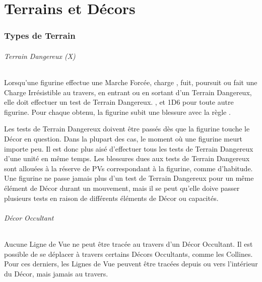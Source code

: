 
\part{Terrains et Décors}

\hypertarget{terraintypes}{\section{Types de Terrain}}
\label{terrain_types}

\paragraph{Terrain Dangereux (X)}

Lorsqu'une figurine effectue une Marche Forcée, charge , fuit, poursuit ou fait une Charge Irrésistible au travers, en entrant ou en sortant d'un Terrain Dangereux, elle doit effectuer un test de Terrain Dangereux. , et 1D6 pour toute autre figurine. Pour chaque  obtenu, la figurine subit une blessure avec la règle .


Les tests de Terrain Dangereux doivent être passés dès que la figurine touche le Décor en question. Dans la plupart des cas, le moment où une figurine meurt importe peu. Il est donc plus aisé d'effectuer tous les tests de Terrain Dangereux d'une unité en même temps. Les blessures dues aux tests de Terrain Dangereux sont allouées à la réserve de PVs correspondant à la figurine, comme d'habitude. Une figurine ne passe jamais plus d'un test de Terrain Dangereux pour un même élément de Décor durant un mouvement, mais il se peut qu'elle doive passer plusieurs tests en raison de différents éléments de Décor ou capacités.

\paragraph{Décor Occultant}

Aucune Ligne de Vue ne peut être tracée au travers d'un Décor Occultant. Il est possible de se déplacer à travers certains Décors Occultants, comme les Collines. Pour ces derniers, les Lignes de Vue peuvent être tracées depuis ou vers l'intérieur du Décor, mais jamais au travers. 


